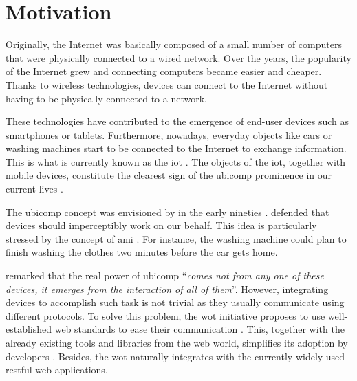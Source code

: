\section{Motivation}
\label{sec:Motivation}


Originally, the Internet was basically composed of a small number of computers that were physically connected to a wired network.
Over the years, the popularity of the Internet grew and connecting computers became easier and cheaper.
Thanks to wireless technologies, devices can connect to the Internet without having to be physically connected to a network.

These technologies have contributed to the emergence of end-user devices such as smartphones or tablets.
Furthermore, nowadays, everyday objects like cars or washing machines start to be connected to the Internet to exchange information.
This is what is currently known as the \ac{iot} \citep{atzori_internet_2010}.
The objects of the \ac{iot}, together with mobile devices, constitute the clearest sign of the \acf{ubicomp} prominence in our current lives \citep{caceres_ubicomp_2012}.

The \ac{ubicomp} concept was envisioned by \citeauthor{weiser1991computer} in the early nineties \citep{weiser1991computer}. %
\citeauthor{weiser1991computer} defended that devices should imperceptibly work on our behalf. %
This idea is particularly stressed by the concept of \ac{ami} \citep{ramos_ambient_2008}.
For instance, the washing machine could plan to finish washing the clothes two minutes before the car gets home.


\bigskip


\citeauthor{weiser1991computer} remarked that the real power of \ac{ubicomp} ``\emph{comes not from any one of these devices, it emerges from the interaction of all of them}''.
However, integrating devices to accomplish such task is not trivial as they usually communicate using different protocols.
To solve this problem, the \ac{wot} initiative proposes to use well-established web standards to ease their communication \citep{guinard_thesis_2011}.
This, together with the already existing tools and libraries from the web world, simplifies its adoption by developers \citep{guinard_search_2011}.
Besides, the \ac{wot} naturally integrates with the currently widely used \acs{rest}ful web applications.

